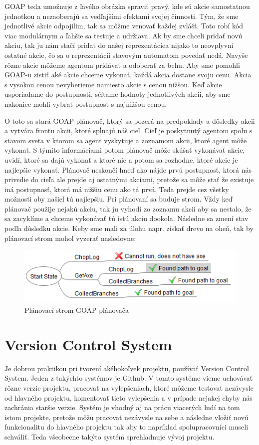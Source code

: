 GOAP teda umožnuje z ľavého obrázka spraviť pravý, kde sú akcie samostatnou jednotkou a nezaoberajú sa vedľajšími efektami svojej činnosti. Tým, že sme jednotlivé akcie odpojilim, tak sa môžme venovať každej zvlášť. Toto robí kód viac modulárnym a ľahšie sa testuje a udržiava. Ak by sme chceli pridať novú akciu, tak ju nám stačí pridať do našej reprezentáciea nijako to neovplyvní ostatné akcie, čo sa o reprezentácii stavovým automatom povedať nedá. Navyše rôzne akcie môžeme agentom pridávať a odoberať za behu. Aby sme pomohli GOAP-u zistiť aké akcie chceme vykonať, každá akcia dostane svoju cenu. Akcia s vysokou cenou nevyberieme namiesto akcie s cenou nižšou. Keď akcie usporiadame do postupnosti, sčítame hodnoty jednotlivých akcii, aby sme nakoniec mohli vybrať postupnosť s najnižšou cenou.\par
O toto sa stará GOAP plánovač, ktorý sa pozerá na predpoklady a dôsledky akcii a vytvára frontu akcii, ktoré spĺnajú náš cieľ. Cieľ je poskytnutý agentom spolu s stavom sveta v ktorom sa agent vyskytuje a zoznamom akcii, ktoré agent môže vykonať. S týmito informáciami potom plánovač môže skúšať vykonávať akcie, uvidí, ktoré sa dajú vykonať a ktoré nie a potom sa rozhodne, ktoré akcie je najlepšie vykonať. Plánovač neskončí hneď ako nájde prvú postupnosť, ktorá nás privedie do cieľa ale prejde aj ostatnými akciami, pretože sa môže stať že existuje iná postupnosť, ktorá má nižšiu cenu ako tá prvá. Teda prejde cez všetky možnosti aby našiel tú najlepšiu. Pri plánovaní sa buduje strom. Vždy keď plánovač použije nejakú akciu, tak ju vyhodí zo zoznamu akcií aby sa nestalo, že sa zacyklíme a chceme vykonávať tú istú akciu dookola. Následne sa zmení stav podľa dôsledku akcie. Keby sme mali za úlohu napr. získať drevo na oheň, tak by plánovací strom mohol vyzerať nasledovne:
\begin{figure}[H] 
\begin{center}
\includegraphics[scale=1.0]{img/plan_tree.png}
\caption{Plánovací strom GOAP plánovača}
\label{fig:ch23}
\end{center}
\end{figure}
\section{Version Control System}
Je dobrou praktikou pri tvorení akéhokoľvek projektu, používať Version Control System. Jeden z takýchto systémov je Github. V tomto systéme vieme uchovávať rôzne verzie projektu, pracovať na vylepšeniach, ktoré môžeme testovať nezávysle od hlavného projektu, komentovať tieto vylepšenia a v prípade nejakej chyby nás zachránia staršie verzie. Systém je vhodný aj na prácu viacerých ludí na tom istom projekte, pretože môžu pracovať nezávysle na sebe a následne vložiť novú funkcionalitu do hlavného projektu tak aby to napríklad spolupracovníci museli schváliť. Teda všeobecne takýto systém sprehľadnuje vývoj projektu.
